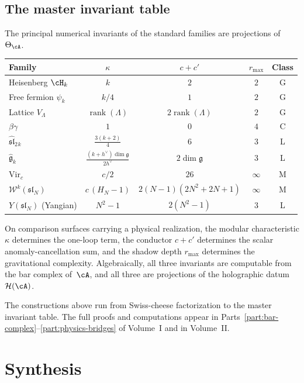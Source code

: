 \subsection{The master invariant table}
\label{subsec:thqg-intro-guide-master-table}

The principal numerical invariants of the standard families are
projections of~$\Theta_\cA$.

\begin{center}
\small
\renewcommand{\arraystretch}{1.15}
\begin{tabular}{lcccc}
\textbf{Family}
 & $\kappa$ & $c + c'$ & $r_{\max}$ & \textbf{Class} \\ \hline
Heisenberg $\cH_k$ & $k$ & $2$ & $2$ & G \\[2pt]
Free fermion $\psi_k$ & $k/4$ & $1$ & $2$ & G \\[2pt]
Lattice $V_\Lambda$ & $\operatorname{rank}(\Lambda)$ & $2\operatorname{rank}(\Lambda)$ & $2$ & G \\[2pt]
$\beta\gamma$ & $1$ & $0$ & $4$ & C \\[2pt]
$\widehat{\mathfrak{sl}}_2{}_k$
 & $\frac{3(k+2)}{4}$
 & $6$ & $3$ & L \\[2pt]
$\widehat{\mathfrak{g}}_k$
 & $\frac{(k+h^\vee)\dim\mathfrak{g}}{2h^\vee}$
 & $2\dim\mathfrak{g}$ & $3$ & L \\[2pt]
$\mathrm{Vir}_c$ & $c/2$ & $26$ & $\infty$ & M \\[2pt]
$\mathcal{W}^k(\mathfrak{sl}_N)$
 & $c\,(H_N - 1)$
 & $2(N{-}1)(2N^2{+}2N{+}1)$
 & $\infty$ & M \\[2pt]
$Y(\mathfrak{sl}_N)$ (Yangian)
 & $N^2 - 1$ & $2(N^2-1)$ & $3$ & L
\end{tabular}
\end{center}

\noindent
On comparison surfaces carrying a physical realization, the modular
characteristic $\kappa$ determines the one-loop term, the conductor
$c + c'$ determines the scalar anomaly-cancellation sum, and the
shadow depth $r_{\max}$ determines the gravitational complexity.
Algebraically, all three invariants are computable from the bar
complex of~$\cA$, and all three are projections of the holographic
datum~$\mathcal{H}(\cA)$.

The constructions above run from Swiss-cheese factorization to the
master invariant table. The full proofs and computations appear in
Parts~\ref{part:bar-complex}--\ref{part:physics-bridges} of Volume~I
and in Volume~II.

\section{Synthesis}
\label{sec:thqg-intro-suppl-supplement}

